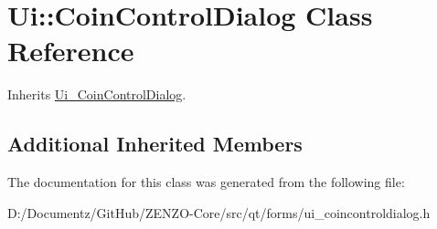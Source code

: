 \hypertarget{class_ui_1_1_coin_control_dialog}{}\section{Ui\+::Coin\+Control\+Dialog Class Reference}
\label{class_ui_1_1_coin_control_dialog}


Inherits \mbox{\hyperlink{class_ui___coin_control_dialog}{Ui\+\_\+\+Coin\+Control\+Dialog}}.

\subsection*{Additional Inherited Members}


The documentation for this class was generated from the following file\+:\begin{DoxyCompactItemize}
\item 
D\+:/\+Documentz/\+Git\+Hub/\+Z\+E\+N\+Z\+O-\/\+Core/src/qt/forms/ui\+\_\+coincontroldialog.\+h\end{DoxyCompactItemize}
